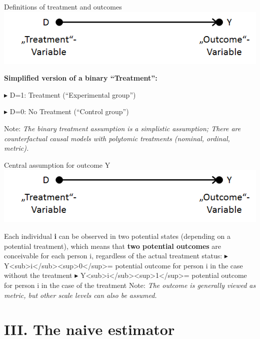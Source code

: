 \documentclass[
  ignorenonframetext,
]{beamer}
\begin{document}
\begin{frame}{Definitions of treatment and outcomes}
\protect\hypertarget{definitions-of-treatment-and-outcomes}{}
\includegraphics{Graphics/D_on_Y_names.png}

\textbf{Simplified version of a binary ``Treatment'':}

▸ D=1: Treatment (``Experimental group'')

▸ D=0: No Treatment (``Control group'')

Note: \emph{The binary treatment assumption is a simplistic assumption;
There are counterfactual causal models with polytomic treatments
(nominal, ordinal, metric).}
\end{frame}

\begin{frame}{Central assumption for outcome Y}
\protect\hypertarget{central-assumption-for-outcome-y}{}
\includegraphics{Graphics/D_on_Y_names.png}

Each individual \textbf{i} can be observed in two potential states
(depending on a potential treatment), which means that \textbf{two
potential outcomes} are conceivable for each person i, regardless of the
actual treatment status: ▸
Y\textless sub\textgreater i\textless/sub\textgreater\textless sup\textgreater0\textless/sup\textgreater=
potential outcome for person i in the case without the treatment ▸
Y\textless sub\textgreater i\textless/sub\textgreater\textless sup\textgreater1\textless/sup\textgreater=
potential outcome for person i in the case of the treatment Note:
\emph{The outcome is generally viewed as metric, but other scale levels
can also be assumed.}
\end{frame}

\hypertarget{iii.-the-naive-estimator}{%
\section{III. The naive estimator}\label{iii.-the-naive-estimator}}
\end{document}
